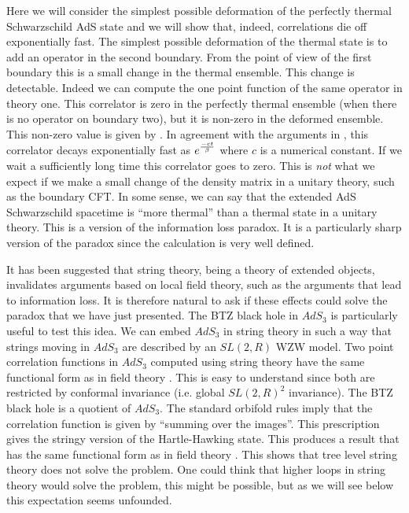 Here we will consider the simplest possible deformation of the perfectly
thermal Schwarzschild AdS 
state and we will show that, indeed, correlations die off
exponentially fast. 
The simplest possible deformation of the thermal state is to add an 
operator in the second boundary. From the point of view of the first
boundary this is a small change in the thermal ensemble. This change
is detectable. Indeed we can compute the one point function of 
the same operator in theory one. This correlator is zero in the perfectly
thermal ensemble (when there is no operator on boundary two), but it
is non-zero in the deformed ensemble. This non-zero value is given by
\other . In agreement with the arguments in \hawkinginfo \hh , 
this correlator decays exponentially fast as $e^{ - c  t \over \beta}$
where $c$ is a numerical constant. 
If we wait a sufficiently long time this correlator goes to zero. 
This is {\it not}  what we expect if we make a small change of the 
density matrix in a unitary theory, such as the boundary CFT. 
In some sense, we can say that the extended AdS Schwarzschild
spacetime  is ``more thermal'' than a thermal state in a 
 unitary theory.
 This is a version of the information loss paradox. It is 
a particularly sharp version of the paradox since the calculation is
very well defined. 

 
It has been suggested that string theory, being a theory of extended
objects,  invalidates  arguments based on local field theory, such
as the arguments that lead to information loss.
It is therefore natural to ask if these effects could solve the paradox
that we have just presented. The BTZ black hole in $AdS_3$ is particularly 
useful to test this idea. We can embed $AdS_3$ in string theory in
such a way that strings moving in $AdS_3$ are described by an 
$SL(2,R)$ WZW model. Two point correlation functions in $AdS_3$ computed
using string theory have the same functional form as in field theory
\teschner \zam . 
This is easy to understand since both are restricted by conformal
invariance (i.e.  global $SL(2,R)^2$
invariance).
 The BTZ black hole is a quotient of $AdS_3$. 
The standard orbifold rules imply that the correlation function is
given by ``summing over the images''. This prescription gives  the 
stringy version of the Hartle-Hawking state. 
This produces a result that 
has the same functional form as in field theory \same \other . 
This shows that tree level string theory does not solve the problem. 
One could think that higher loops in string theory would solve the 
problem, this might be possible, but as we will see below this expectation
seems  unfounded. 

